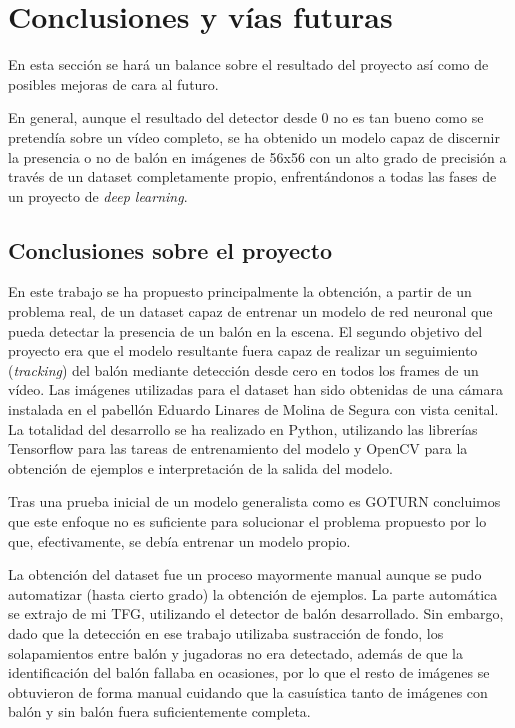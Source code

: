 \section{Conclusiones y vías futuras}
En esta sección se hará un balance sobre el resultado del proyecto así como de posibles mejoras de cara al futuro. 

En general, aunque el resultado del detector desde 0 no es tan bueno como se pretendía sobre un vídeo completo, se ha obtenido un modelo capaz de discernir la presencia o no de balón en imágenes de 56x56 con un alto grado de precisión a través de un dataset completamente propio, enfrentándonos a todas las fases de un proyecto de \textit{deep learning}.

\subsection{Conclusiones sobre el proyecto}

En este trabajo se ha propuesto principalmente la obtención, a partir de un problema real, de un dataset capaz de entrenar un modelo de red neuronal que pueda detectar la presencia de un balón en la escena. El segundo objetivo del proyecto era que el modelo resultante fuera capaz de realizar un seguimiento (\textit{tracking}) del balón mediante detección desde cero en todos los frames de un vídeo. Las imágenes utilizadas para el dataset han sido obtenidas de una cámara instalada en el pabellón Eduardo Linares de Molina de Segura con vista cenital. La totalidad del desarrollo se ha realizado en Python, utilizando las librerías Tensorflow para las tareas de entrenamiento del modelo y OpenCV para la obtención de ejemplos e interpretación de la salida del modelo.

Tras una prueba inicial de un modelo generalista como es GOTURN concluimos que este enfoque no es suficiente para solucionar el problema propuesto por lo que, efectivamente, se debía entrenar un modelo propio.

La obtención del dataset fue un proceso mayormente manual aunque se pudo automatizar (hasta cierto grado) la obtención de ejemplos. La parte automática se extrajo de mi TFG, utilizando el detector de balón desarrollado. Sin embargo, dado que la detección en ese trabajo utilizaba sustracción de fondo, los solapamientos entre balón y jugadoras no era detectado, además de que la identificación del balón fallaba en ocasiones, por lo que el resto de imágenes se obtuvieron de forma manual cuidando que la casuística tanto de imágenes con balón y sin balón fuera suficientemente completa.

